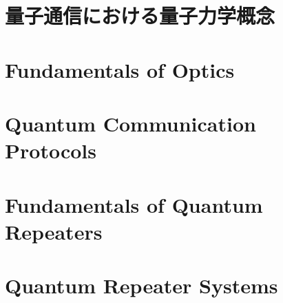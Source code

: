 \documentclass[6x9, dvipdfmx]{newmath}
\begin{document}
\begin{preface}

\author{Michal Hajdu\v{s}ek and Rodney Van Meter}
\date{\today}
\end{preface}

\part{量子通信における量子力学概念}









\part{Fundamentals of Optics}



\part{Quantum Communication Protocols}




\part{Fundamentals of Quantum Repeaters}





\part{Quantum Repeater Systems}


\end{document}

